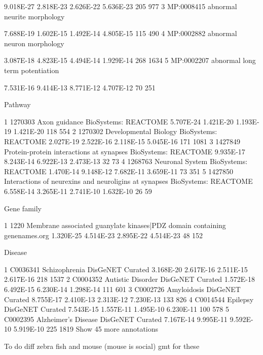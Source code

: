 9.018E-27 
2.818E-23 
2.626E-22 
5.636E-23 
205 
977 
3 
MP:0008415 
abnormal neurite morphology 

7.688E-19 
1.602E-15 
1.492E-14 
4.805E-15 
115 
490 
4 
MP:0002882 
abnormal neuron morphology 

3.087E-18 
4.823E-15 
4.494E-14 
1.929E-14 
268 
1634 
5 
MP:0002207 
abnormal long term potentiation 

7.531E-16 
9.414E-13 
8.771E-12 
4.707E-12 
70 
251


Pathway


1 
1270303 
Axon guidance 
BioSystems: REACTOME 
5.707E-24 
1.421E-20 
1.193E-19 
1.421E-20 
118 
554 
2 
1270302 
Developmental Biology 
BioSystems: REACTOME 
2.027E-19 
2.522E-16 
2.118E-15 
5.045E-16 
171 
1081 
3 
1427849 
Protein-protein interactions at synapses 
BioSystems: REACTOME 
9.935E-17 
8.243E-14 
6.922E-13 
2.473E-13 
32 
73 
4 
1268763 
Neuronal System 
BioSystems: REACTOME 
1.470E-14 
9.148E-12 
7.682E-11 
3.659E-11 
73 
351 
5 
1427850 
Interactions of neurexins and neuroligins at synapses 
BioSystems: REACTOME 
6.558E-14 
3.265E-11 
2.741E-10 
1.632E-10 
26 
59


Gene family


1 
1220 
Membrane associated guanylate kinases|PDZ domain containing 
genenames.org 
1.320E-25 
4.514E-23 
2.895E-22 
4.514E-23 
48 
152


Disease 


1 
C0036341 
Schizophrenia 
DisGeNET Curated 
3.168E-20 
2.617E-16 
2.511E-15 
2.617E-16 
218 
1537 
2 
C0004352 
Autistic Disorder 
DisGeNET Curated 
1.572E-18 
6.492E-15 
6.230E-14 
1.298E-14 
111 
601 
3 
C0002726 
Amyloidosis 
DisGeNET Curated 
8.755E-17 
2.410E-13 
2.313E-12 
7.230E-13 
133 
826 
4 
C0014544 
Epilepsy 
DisGeNET Curated 
7.543E-15 
1.557E-11 
1.495E-10 
6.230E-11 
100 
578 
5 
C0002395 
Alzheimer's Disease 
DisGeNET Curated 
7.167E-14 
9.995E-11 
9.592E-10 
5.919E-10 
225 
1819 
Show 45 more annotations


To do diff zebra fish and mouse (mouse is social)
gmt for these
